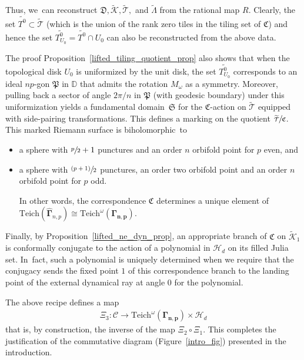 \documentclass[JEP,XML,SOM,Unicode,NoFloatCountersInSection,published]{cedram}
\newcommand{\psfrac}[2]{\sfrac{(#1)}{#2}}
\let\faktor\sfrac
\theoremstyle{definition}
\theoremstyle{remark}
\newcommand{\D}{\mathbb{D}}
\newcommand{\cC}{\mathcal{C}}
\newcommand{\cT}{\mathcal{T}}
\begin{document}
Thus, we~can reconstruct $\mathfrak{D}, \widetilde{\mathcal{K}}, \widetilde{\mathcal{T}},$ and $\widetilde{\Lambda}$ from the rational map $R$. Clearly, the set $\widetilde{T^0}\subset\widetilde{\cT}$ (which is the union of the rank zero tiles in the tiling set of $\mathfrak{C}$) and hence the set $\widetilde{T^0_{U_0}}= \widetilde{T^0}\cap U_0$ can also be reconstructed from the above data.

The proof Proposition~\ref{lifted_tiling_quotient_prop} also shows that when the topological disk $U_0$ is uniformized by the unit disk, the set $\widetilde{T^0_{U_0}}$ corresponds to an ideal $np$-gon $\mathfrak{P}$ in $\D$ that admits the rotation $M_\omega$ as a symmetry. Moreover, pulling back a sector of angle $2\pi/n$ in $\mathfrak{P}$ (with geodesic boundary) under this uniformization yields a fundamental domain~$\mathfrak{S}$ for the $\mathfrak{C}$-action on $\widetilde{\cT}$ equipped with side-pairing transformations. This defines a marking on the quotient $\faktor{\widetilde{\cT}}{\mathfrak{C}}$. This marked Riemann surface is biholomorphic~to\vspace*{-5pt}
\begin{itemize}
\item
a sphere with $\sfrac{p}{2}+1$ punctures and an order $n$ orbifold point for $p$ even, and
\item
a sphere with $\psfrac{p+1}{2}$ punctures, an order two orbifold point and an order $n$ orbifold point for $p$ odd.

In other words, the correspondence $\mathfrak{C}$ determines a unique element of $\mathrm{Teich}(\widehat{\pmb{\Gamma}}_{n,p})\cong\mathrm{Teich}^\omega(\pmb{\Gamma_{n,p}})$.
\end{itemize}

Finally, by Proposition~\ref{lifted_ne_dyn_prop}, an appropriate branch of $\mathfrak{C}$ on $\widetilde{\mathcal{K}}_1$ is conformally conjugate to the action of a polynomial in $\mathcal{H}_{d}$ on its filled Julia set. In~fact, such a polynomial is uniquely determined when we require that the conjugacy sends the fixed point $1$ of this correspondence branch to the landing point of the external dynamical ray at angle $0$ for the polynomial.

The above recipe defines a map
\begin{equation*}
\begin{split}
\Xi_3:\cC \to \mathrm{Teich}^\omega(\pmb{\Gamma_{n,p}})\times\mathcal{H}_{d}
\label{corr_to_teich_hyp}
\end{split}
\end{equation*}
that is, by construction, the inverse of the map $\Xi_2\circ\Xi_1$. This completes the justification of the commutative diagram (Figure~\ref{intro_fig}) presented in the introduction.
\end{document}
